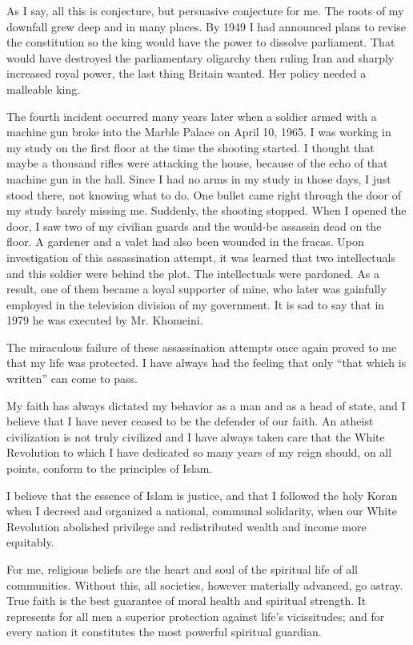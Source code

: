 As I say, all this is conjecture, but persuasive conjecture for me. The roots of my downfall grew deep and in many places. By 1949 I had announced plans to revise the constitution so the king would have the power to dissolve parliament. That would have destroyed the parliamentary oligarchy then ruling Iran and sharply increased royal power, the last thing Britain wanted. Her policy needed a malleable king. 

The fourth incident occurred many years later when a soldier armed with a machine gun broke into the Marble Palace on April 10, 1965. I was working in my study on the first floor at the time the shooting started. I thought that maybe a thousand rifles were attacking the house, because of the echo of that machine gun in the hall. Since I had no arms in my study in those days, I just stood there, not knowing what to do. One bullet came right through the door of my study barely missing me. Suddenly, the shooting stopped. When I opened the door, I saw two of my civilian guards and the would-be assassin dead on the floor. A gardener and a valet had also been wounded in the fracas. Upon investigation of this assassination attempt, it was learned that two intellectuals and this soldier were behind the plot. The intellectuals were pardoned. As a result, one of them became a loyal supporter of mine, who later was gainfully employed in the television division of my government. It is sad to say that in 1979 he was executed by Mr. Khomeini. 

The miraculous failure of these assassination attempts once again proved to me that my life was protected. I have always had the feeling that only “that which is written” can come to pass. 

My faith has always dictated my behavior as a man and as a head of state, and I believe that I have never ceased to be the defender of our faith. An atheist civilization is not truly civilized and I have always taken care that the White Revolution to which I have dedicated so many years of my reign should, on all points, conform to the principles of Islam. 

I believe that the essence of Islam is justice, and that I followed the holy Koran when I decreed and organized a national, communal solidarity, when our White Revolution abolished privilege and redistributed wealth and income more equitably. 

For me, religious beliefs are the heart and soul of the spiritual life of all communities. Without this, all societies, however materially advanced, go astray. True faith is the best guarantee of moral health and spiritual strength. It represents for all men a superior protection against life's vicissitudes; and for every nation it constitutes the most powerful spiritual guardian. 

